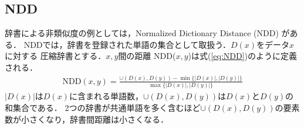 




\subsection{NDD} %
\label{sub:ndd}

辞書による非類似度の例としては，Normalized Dictionary Distance (NDD) \cite{NDD} がある．
NDDでは，辞書を登録された単語の集合として取扱う．$D(x)$をデータ$x$に対する
圧縮辞書とする．$x,y$間の距離 NDD($x,y$)は式(\ref{eq:NDD})のように定義される．
\begin{eqnarray}
\mathrm{NDD}(x,y) = \frac{ \cup(D(x),D(y)) - \min\{|D(x)|,|D(y)|\} }{ \max\{|D(x)|,|D(y)|\} }
\label{eq:NDD}
\end{eqnarray}
$|D(x)|$は$D(x)$に含まれる単語数，$\cup(D(x),D(y))$は$D(x)$と$D(y)$の和集合である．
2つの辞書が共通単語を多く含むほど$\cup(D(x),D(y))$の要素数が小さくなり，辞書間距離は小さくなる．

